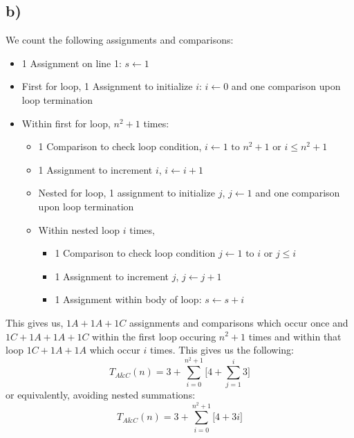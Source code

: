 \documentclass{article}
\begin{document}
\subsection*{b)}
We count the following assignments and comparisons:
\begin{itemize}
    \item 1 Assignment on line 1: $\boxed{s\leftarrow 1}$
    \item First for loop, 1 Assignment to initialize $i$: $\boxed{i\leftarrow 0}$ and one comparison upon loop termination
    \item Within first for loop, $n^{2}+1$ times: \begin{itemize}
        \item 1 Comparison to check loop condition, $\boxed{i\leftarrow 1 \text{ to } n^{2}+1}$ or $\boxed{i\leq n^{2}+1}$
        \item 1 Assignment to increment $i$, $\boxed{i\leftarrow i+1}$
        \item Nested for loop, 1 assignment to initialize $j$, $\boxed{j \leftarrow 1}$ and one comparison upon loop termination
        \item Within nested loop $i$ times, \begin{itemize}
            \item 1 Comparison to check loop condition $\boxed{j\leftarrow 1} \text{ to } i$ or $\boxed{j\leq i}$
            \item 1 Assignment to increment $j$, $\boxed{j\leftarrow j+1}$
            \item 1 Assignment within body of loop: $\boxed{s\leftarrow s + i}$ 
        \end{itemize}
    \end{itemize}
\end{itemize}
This gives us, $1A+1A+1C$ assignments and comparisons which occur once and $1C+1A+1A+1C$ within the first loop occuring $n^{2}+1$ times and within that loop $1C+1A+1A$ which occur $i$ times. This gives us the following: $$T_{A\&C}(n)=3+\sum_{i=0}^{n^{2}+1}\bigg[4+\sum_{j=1}^i 3\bigg]$$
or equivalently, avoiding nested summations: $$T_{A\&C}(n)=3+\sum_{i=0}^{n^{2}+1}\bigg[4+3i\bigg]$$

\newpage
\end{document}
